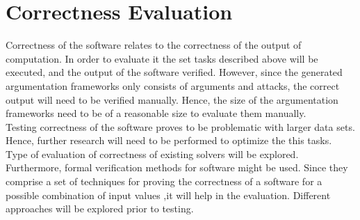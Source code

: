 \section{Correctness Evaluation}
Correctness of the software relates to the correctness of the output of computation. In order to evaluate it the set tasks described above will be executed, and the output of the software verified. However, since the generated argumentation frameworks only consists of arguments and attacks, the correct output will need to be verified manually. Hence, the size of the argumentation frameworks need to be of a reasonable size to evaluate them manually. \\
Testing correctness of the software proves to be problematic with larger data sets. Hence, further research will need to be performed to optimize the this tasks. Type of evaluation of correctness of existing solvers will be explored. Furthermore, formal verification methods for software might be used. Since they comprise a set of techniques for proving the correctness of a software for a possible combination of input values \citep{murthy2009software},it will help in the evaluation. Different approaches will be explored prior to testing.